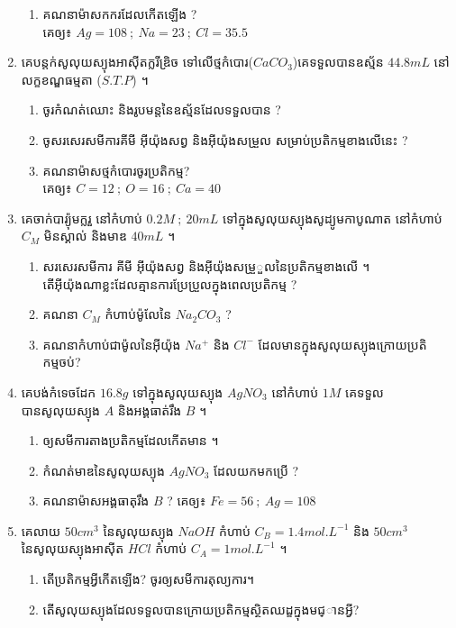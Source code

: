 \documentclass[a4paper]{report}
\begin{document}
\begin{enumerate}[1]
\begin{enumerate}[a]
			\item គណនាម៉ាសកករដែលកើតឡើង ?\\
			គេឲ្យ៖ $Ag=108~;~Na=23~;~Cl=35.5$
		\end{enumerate}
		\item គេបន្តក់សូលុយស្យុងអាស៊ីតក្លរីឌ្រិច ទៅលើថ្មកំបោរ($CaCO_3$)គេទទួលបានឧស្ម័ន $44.8mL$ នៅលក្ខខណ្ឌធម្មតា ($S.T.P$) ។
		\begin{enumerate}[a]
			\item ចូរកំណត់ឈោះ និងរូបមន្តនៃឧស្ម័នដែលទទួលបាន ?
			\item ចូសរសេរសមីការគីមី អ៊ីយ៉ុងសព្វ និងអ៊ីយ៉ុងសម្រួល សម្រាប់ប្រតិកម្មខាងលើនេះ ?
			\item គណនាម៉ាសថ្មកំបោរចូរប្រតិកម្ម?\\
			គេឲ្យ៖ $C=12~;~O=16~;~Ca=40$
		\end{enumerate}
		\item គេចាក់បារ្យ៉ុមក្លរួ នៅកំហាប់ $0.2M~;~20mL$ ទៅក្នុងសូលុយស្យុងសូដ្យូមកាបូណាត នៅកំហាប់ $C_M$ មិនស្គាល់ និងមាឌ $40mL$ ។
		\begin{enumerate}[a]
			\item សរសេរសមីការ គីមី អ៊ីយ៉ុងសព្វ និងអ៊ីយ៉ុងសម្រួួលនៃប្រតិកម្មខាងលើ ។\\ តើអ៊ីយ៉ុងណាខ្លះដែលគ្មានការប្រែប្រួលក្នុងពេលប្រតិកម្ម ?
			\item គណនា $C_M$ កំហាប់ម៉ូលែនៃ $Na_2CO_3$ ?
			\item គណនាកំហាប់ជាម៉ូលនៃអ៊ីយ៉ុង $Na^+$ និង $Cl^-$ ដែលមានក្នុងសូលុយស្យុងក្រោយប្រតិកម្មចប់?
		\end{enumerate}
		\item គេបង់កំទេចដែក $16.8g$ ទៅក្នុងសូលុយស្យុង $AgNO_3$ នៅកំហាប់ $1M$ គេទទួលបានសូលុយស្យុង $A$ និងអង្គធាត់រឹង $B$ ។
		\begin{enumerate}[a]
			\item ឲ្យសមីការតាងប្រតិកម្មដែលកើតមាន ។
			\item កំណត់មាឌនៃសូលុយស្យុង $AgNO_3$ ដែលយកមកប្រើ ?
			\item គណនាម៉ាសអង្គធាតុរឹង $B$ ?
			គេឲ្យ៖ $Fe=56~;~Ag=108$
		\end{enumerate}
		\item គេលាយ $50cm^3$ នៃសូលុយស្យុង $NaOH$ កំហាប់ $C_B=1.4mol.L^{-1}$ និង $50cm^3$ នៃសូលុយស្យុងអាស៊ីត $HCl$ កំហាប់ $C_A=1mol.L^{-1}$ ។
		\begin{enumerate}[a]
			\item តើប្រតិកម្មអ្វីកើតឡើង? ចូរឲ្យសមីការតុល្យការ។
			\item តើសូលុយស្យុងដែលទទួលបានក្រោយប្រតិកម្មស្ថិតឈដ្ខក្នុងមជ្ានអ្វី?\\

\end{enumerate}
\end{enumerate}
\end{document}
